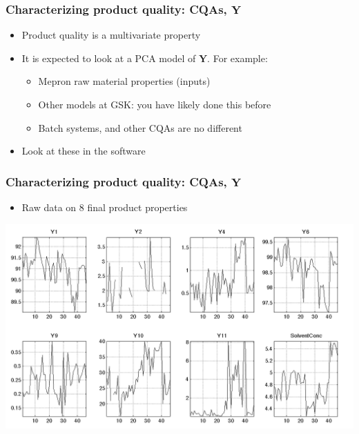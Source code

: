 \begin{frame}\frametitle{Characterizing product quality: CQAs, \( \mathbf{Y}\)}

\begin{itemize}
	\item	Product quality is a multivariate property
	
 	\item	It is expected to look at a PCA model of \( \mathbf{Y} \).  For example:
	
		\begin{itemize}
			\item	Mepron raw material properties (inputs)

			\item	Other models at GSK: you have likely done this before
			
			\item	Batch systems, and other CQAs are no different
		\end{itemize}
		
		\item	Look at these in the software
\end{itemize}

\end{frame}

\begin{frame}\frametitle{Characterizing product quality: CQAs, \( \mathbf{Y}\)}

\begin{itemize}
	\item	Raw data on 8 final product properties 
\end{itemize}

\begin{center}
	\includegraphics[width=\textwidth]{images/fmc/fmc-Z-raw-data.png}
\end{center}

\end{frame}

